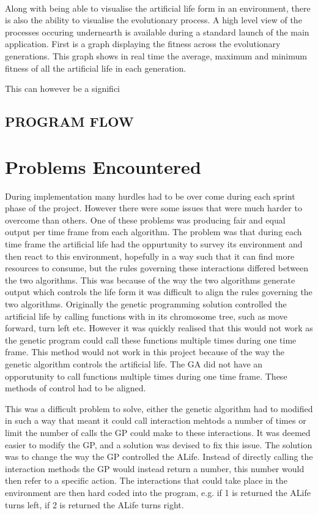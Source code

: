 \documentclass[12pt]{article}
\begin{document}
\paragraph{}
Along with being able to visualise the artificial life form in an environment, there is also the ability to visualise the
evolutionary process. A high level view of the processes occuring undernearth is available during a standard launch of the
main application. First is a graph displaying the fitness across the evolutionary generations. This graph shows in real time the
average, maximum and minimum fitness of all the artificial life in each generation.

This can however be a significi

\subsection{PROGRAM FLOW}

\section{Problems Encountered}

During implementation many hurdles had to be over come during each sprint phase of the project. However there were some issues that were much harder to overcome than others. One of these problems was
producing fair and equal output per time frame from each algorithm. The problem was that during each time frame the artificial life had the oppurtunity to survey its environment and then react to this
environment, hopefully in a way such that it can find more resources to consume, but the rules governing these interactions differed between the two algorithms.
This was because of the way the two algorithms generate output which controls the life form it was difficult to align
the rules governing the two algorithms. Originally the genetic programming solution controlled the artificial life by calling functions with in its chromosome tree, such as move forward, turn left etc.
However it was quickly realised that this would not work as the genetic program could call these functions multiple times during one time frame. This method would not work in this project because
of the way the genetic algorithm controls the artificial life. The GA did not have an opporutunity to call functions multiple times during one time frame. These methods of control had to be aligned. 

This was a difficult problem to solve, either the genetic algorithm had to modified in such a way that meant it could call interaction mehtods
a number of times or limit the number of calls the GP could make to these interactions. It was deemed easier to modify the GP, and a solution
was devised to fix this issue. The solution was to change the way the GP controlled the ALife. Instead of directly calling the interaction methods
the GP would instead return a number, this number would then refer to a specific action. The interactions that could take place in 
the environment are then hard coded into the program, e.g. if 1 is returned the ALife turns left, if 2 is returned the ALife turns right.
\end{document}
